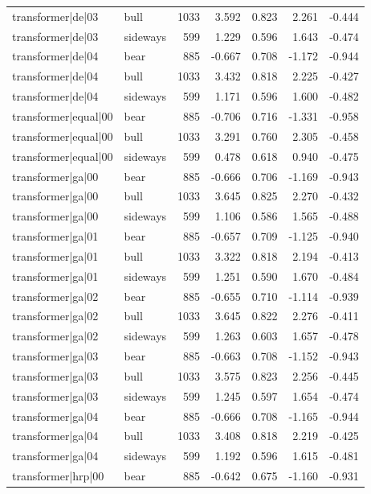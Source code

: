 \begin{table}
\begin{tabular}{llrrrrr}
transformer|de|03 & bull & 1033 & 3.592 & 0.823 & 2.261 & -0.444 \\
transformer|de|03 & sideways & 599 & 1.229 & 0.596 & 1.643 & -0.474 \\
transformer|de|04 & bear & 885 & -0.667 & 0.708 & -1.172 & -0.944 \\
transformer|de|04 & bull & 1033 & 3.432 & 0.818 & 2.225 & -0.427 \\
transformer|de|04 & sideways & 599 & 1.171 & 0.596 & 1.600 & -0.482 \\
transformer|equal|00 & bear & 885 & -0.706 & 0.716 & -1.331 & -0.958 \\
transformer|equal|00 & bull & 1033 & 3.291 & 0.760 & 2.305 & -0.458 \\
transformer|equal|00 & sideways & 599 & 0.478 & 0.618 & 0.940 & -0.475 \\
transformer|ga|00 & bear & 885 & -0.666 & 0.706 & -1.169 & -0.943 \\
transformer|ga|00 & bull & 1033 & 3.645 & 0.825 & 2.270 & -0.432 \\
transformer|ga|00 & sideways & 599 & 1.106 & 0.586 & 1.565 & -0.488 \\
transformer|ga|01 & bear & 885 & -0.657 & 0.709 & -1.125 & -0.940 \\
transformer|ga|01 & bull & 1033 & 3.322 & 0.818 & 2.194 & -0.413 \\
transformer|ga|01 & sideways & 599 & 1.251 & 0.590 & 1.670 & -0.484 \\
transformer|ga|02 & bear & 885 & -0.655 & 0.710 & -1.114 & -0.939 \\
transformer|ga|02 & bull & 1033 & 3.645 & 0.822 & 2.276 & -0.411 \\
transformer|ga|02 & sideways & 599 & 1.263 & 0.603 & 1.657 & -0.478 \\
transformer|ga|03 & bear & 885 & -0.663 & 0.708 & -1.152 & -0.943 \\
transformer|ga|03 & bull & 1033 & 3.575 & 0.823 & 2.256 & -0.445 \\
transformer|ga|03 & sideways & 599 & 1.245 & 0.597 & 1.654 & -0.474 \\
transformer|ga|04 & bear & 885 & -0.666 & 0.708 & -1.165 & -0.944 \\
transformer|ga|04 & bull & 1033 & 3.408 & 0.818 & 2.219 & -0.425 \\
transformer|ga|04 & sideways & 599 & 1.192 & 0.596 & 1.615 & -0.481 \\
transformer|hrp|00 & bear & 885 & -0.642 & 0.675 & -1.160 & -0.931 \\

\end{tabular}
\end{table}
